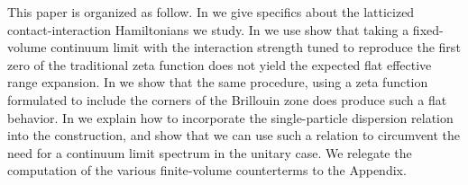 This paper is organized as follow.  In  we give specifics about the latticized contact-interaction Hamiltonians we study.  In  we use show that taking a fixed-volume continuum limit with the interaction strength tuned to reproduce the first zero of the traditional zeta function does not yield the expected flat effective range expansion.  In  we show that the same procedure, using a zeta function formulated to include the corners of the Brillouin zone does produce such a flat behavior.
In  we explain how to incorporate the single-particle dispersion relation into the \Luscher construction, and show that we can use such a relation to circumvent the need for a continuum limit spectrum in the unitary case.
We relegate the computation of the various finite-volume counterterms to the Appendix.

